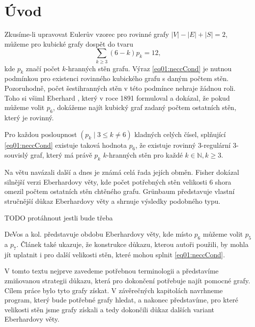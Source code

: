 \chapter*{Úvod}

Zkusíme-li upravovat Eulerův vzorec pro rovinné grafy
$|V|-|E|+|S|=2$, můžeme pro kubické grafy dospět do tvaru 
\begin{equation}\label{eq01:neccCond}
\sum_{k \geq 3}{(6-k)p_k}=12,
\end{equation}
kde $p_k$ značí počet $k$-hranných stěn grafu. Výraz \eqref{eq01:neccCond} je nutnou podmínkou pro existenci rovinného kubického grafu s daným počtem stěn. Pozoruhodně, počet šestihranných stěn v této podmínce nehraje žádnou roli. Toho si všiml Eberhard \cite{Eberhard91}, který v roce 1891 formuloval a dokázal, že pokud můžeme volit $p_6$, dokážeme najít kubický graf zadaný počtem ostatních stěn, který je rovinný.

\begin{veta}\label{veta:Eberhard}
Pro každou posloupnost $(p_k \mid 3 \leq k \neq 6)$ kladných celých čísel, splňující \eqref{eq01:neccCond} existuje taková hodnota $p_6$, že existuje rovinný 3-regulární 3-souvislý graf, který má právě $p_k$ $k$-hranných stěn pro každé $k \in \mathbb{N}, k \geq 3 $.
\end{veta}

Na větu navázali další a dnes je známá celá řada jejích obměn. Fisher \citep{Fisher74} dokázal silnější verzi Eberhardovy věty, kde počet potřebných stěn velikosti 6 shora omezil počtem ostatních stěn chtěného grafu. Grünbaum \citep{Grunbaum} představuje vlastní stručnější důkaz Eberhardovy věty a shrnuje výsledky podobného typu. 

TODO protáhnout jestli bude třeba

DeVos a kol. \citep{Samal09} představuje obdobu Eberhardovy věty, kde místo $p_6$ můžeme volit $p_5$ a $p_7$. Článek také ukazuje, že konstrukce důkazu, kterou autoři použili, by mohla jít uplatnit i pro další velikosti stěn, které mohou splnit \eqref{eq01:neccCond}. 

V tomto textu nejprve zavedeme potřebnou terminologii a představíme zmiňovanou strategii důkazu, která pro dokončení potřebuje najít pomocné grafy. Cílem práce bylo tyto grafy získat. V závěrečných kapitolách navrhneme program, který bude potřebné grafy hledat, a nakonec představíme, pro které velikosti stěn jsme grafy získali a tedy dokončili důkaz dalších variant Eberhardovy věty.
